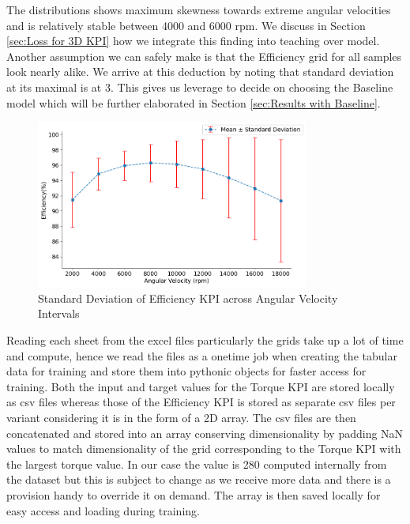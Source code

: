 \documentclass{report} %
\begin{document}
The distributions shows maximum skewness towards extreme angular velocities and is relatively stable between 4000 and 6000 rpm. 
We discuss in Section \ref{sec:Loss for 3D KPI} how we integrate this finding into teaching over model.
Another assumption we can safely make is that the Efficiency grid for all samples look nearly alike. We arrive at this deduction by noting that standard deviation at its 
maximal is at 3. This gives us leverage to decide on choosing the Baseline model which will be further elaborated in Section \ref{sec:Results with Baseline}.

\begin{figure}[H]
    \centering
    \includegraphics[width=0.8\textwidth]{./ReportImages/stddev_y2_nn_Target.png} 
    \caption{Standard Deviation of Efficiency \ac{KPI} across Angular Velocity Intervals} 
    \label{fig:Standard Deviation of Efficiency KPI across Angular Velocity Intervals}
\end{figure}

Reading each sheet from the excel files particularly the grids take up a lot of time and compute, hence we read the files as a onetime job when creating the 
tabular data for training  and store them into pythonic objects for faster access for training.
Both the input and target values for the Torque \ac{KPI} are stored locally as csv files whereas those of the Efficiency \ac{KPI} is stored as separate csv files per 
variant considering it is in the form of a 2\ac{D} array.
The csv files are then concatenated and stored into an array conserving dimensionality by padding \ac{NaN} values to match dimensionality of the grid 
corresponding to the Torque \ac{KPI} with the largest torque value.
In our case the value is 280 computed internally from the dataset but this is subject to change as we receive more data and there is a provision handy to override it 
on demand. The array is then saved locally for easy access and loading during training.
\end{document}
